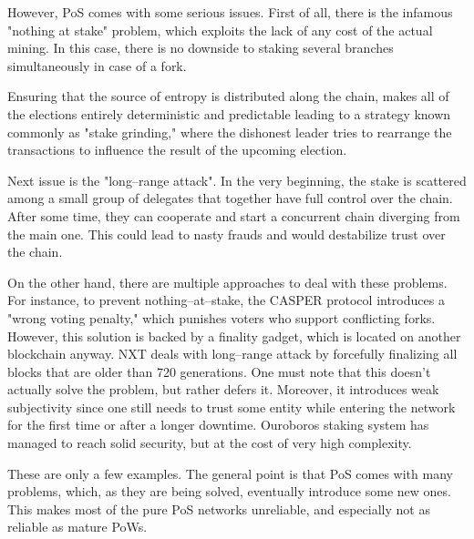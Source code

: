 However, PoS comes with some serious issues. First of all, there is the infamous
"nothing at stake"\cite{pos_flaws_nothing}
problem, which exploits the lack of any cost of the actual mining. In this case,
there is no downside to staking several branches simultaneously in case of a fork.

Ensuring that the source of entropy is distributed along the chain,
makes all of the elections entirely deterministic and predictable leading to a strategy
known commonly as "stake grinding," where the dishonest leader tries to rearrange the
transactions to influence the result of the upcoming election.

Next issue is the "long–range attack"\cite{pos_flaws_long}.
In the very beginning, the stake is scattered among a small
group of delegates that together have full control over the chain. After
some time, they can cooperate and start a concurrent chain diverging from
the main one. This could lead to nasty frauds and would
destabilize trust over the chain.

On the other hand, there are multiple approaches to deal with these problems. For instance,
to prevent nothing–at–stake, the CASPER protocol introduces a "wrong voting
penalty," which punishes
voters who support conflicting forks\cite{casper}.
However, this solution is backed by a finality gadget, which is located on another blockchain
anyway. NXT deals with long–range attack by forcefully
finalizing all blocks that are older than 720 generations\cite{nxt}.
One must note that this doesn't actually solve the problem, but rather defers
it. Moreover, it introduces weak subjectivity since one still needs to trust
some entity while entering the network for the first time or after a longer
downtime. Ouroboros staking system has managed to reach solid security, but
at the cost of very high complexity\cite{ouroboros}.

These are only a few examples. The general point is that PoS comes with many
problems, which, as they are being solved, eventually introduce some new ones. This
makes most of the pure PoS networks unreliable, and especially not as reliable
as mature PoWs.

